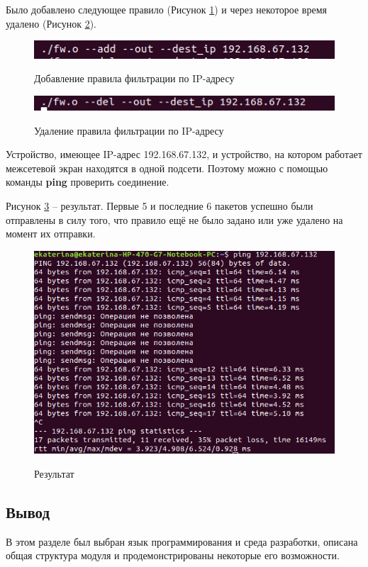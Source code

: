 Было добавлено следующее правило (Рисунок \ref{fig19:image}) и через некоторое время удалено (Рисунок \ref{fig20:image}). 

\begin{figure}[h]
	\begin{center}
		{\includegraphics[scale = 0.6]{img/screenshots/ip/add_rule.png}}
		\caption{Добавление правила фильтрации по IP-адресу}
		\label{fig19:image}
	\end{center}
\end{figure}

\begin{figure}[h]
	\begin{center}
		{\includegraphics[scale = 0.6]{img/screenshots/ip/del_rule.png}}
		\caption{Удаление правила фильтрации по IP-адресу}
		\label{fig20:image}
	\end{center}
\end{figure}

\newpage

Устройство, имеющее IP-адрес 192.168.67.132, и устройство, на котором работает межсетевой экран находятся в одной подсети. Поэтому можно с помощью команды \textbf{ping} проверить соединение.

Рисунок \ref{fig21:image} -- результат. Первые 5 и последние 6 пакетов успешно были отправлены в силу того, что правило ещё не было задано или уже удалено на момент их отправки.
\begin{figure}[h]
	\begin{center}
		{\includegraphics[scale = 0.5]{img/screenshots/ip/result.png}}
		\caption{Результат}
		\label{fig21:image}
	\end{center}
\end{figure}

\subsection{Вывод}
В этом разделе был выбран язык программирования и среда разработки, описана общая структура модуля и продемонстрированы некоторые его возможности.